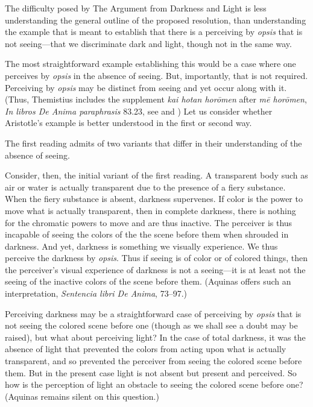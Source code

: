 The difficulty posed by The Argument from Darkness and Light is less understanding the general outline of the proposed resolution, than understanding the example that is meant to establish that there is a perceiving by \emph{opsis} that is not seeing—that we discriminate dark and light, though not in the same way.

The most straightforward example establishing this would be a case where one perceives by \emph{opsis} in the absence of seeing. But, importantly, that is not required. Perceiving by \emph{opsis} may be distinct from seeing and yet occur along with it. (Thus, Themistius includes the supplement \emph{kai hotan horōmen} after \emph{mē horōmen}, \emph{In libros De Anima paraphrasis} 83.23, see \citealt[105, 181 n3]{Todd:1996aa} and \citealt[238]{Browne:1986aa}) Let us consider whether Aristotle's example is better understood in the first or second way.

The first reading admits of two variants that differ in their understanding of the absence of seeing.

Consider, then, the initial variant of the first reading. A transparent body such as air or water is actually transparent due to the presence of a fiery substance. When the fiery substance is absent, darkness supervenes. If color is the power to move what is actually transparent, then in complete darkness, there is nothing for the chromatic powers to move and are thus inactive. The perceiver is thus incapable of seeing the colors of the the scene before them when shrouded in darkness. And yet, darkness is something we visually experience. We thus perceive the darkness by \emph{opsis}. Thus if seeing is of color or of colored things, then the perceiver's visual experience of darkness is not a seeing—it is at least not the seeing of the inactive colors of the scene before them. (Aquinas offers such an interpretation, \emph{Sentencia libri De Anima}, 73–97.)

Perceiving darkness may be a straightforward case of perceiving by \emph{opsis} that is not seeing the colored scene before one (though as we shall see a doubt may be raised), but what about perceiving light? In the case of total darkness, it was the absence of light that prevented the colors from acting upon what is actually transparent, and so prevented the perceiver from seeing the colored scene before them. But in the present case light is not absent but present and perceived. So how is the perception of light an obstacle to seeing the colored scene before one? (Aquinas remains silent on this question.)


